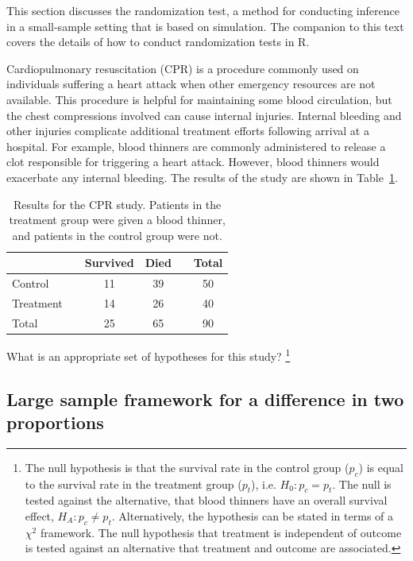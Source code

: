 This section discusses the randomization test, a method for conducting inference in a small-sample setting that is based on simulation. The companion to this text covers the details of how to conduct randomization tests in \textsf{R}.

Cardiopulmonary resuscitation (CPR) is a procedure commonly used on individuals suffering a heart attack when other emergency resources are not available. This procedure is helpful for maintaining some blood circulation, but the chest compressions involved can cause internal injuries. Internal bleeding and other injuries complicate additional treatment efforts following arrival at a hospital. For example, blood thinners are commonly administered to release a clot responsible for triggering a heart attack. However, blood thinners would exacerbate any internal bleeding. The results of the study are shown in Table~\ref{resultsForCPRStudyInSmallSampleSection}.

\begin{table}[ht]
	\centering
	\begin{tabular}{lccccc}
		\hline
		&& Survived 	& Died 	&& Total \\
		\hline
		Control		&& 11		& 39		&& 50 \\
		Treatment		&& 14		& 26		&& 40 \\
		\hline
		Total			&& 25		& 65		&& 90 \\
		\hline
	\end{tabular}
	\caption{Results for the CPR study. Patients in the treatment group were given a blood thinner, and patients in the control group were not.}
	\label{resultsForCPRStudyInSmallSampleSection}
\end{table}

\begin{exercise} What is an appropriate set of hypotheses for this study? \footnote{The null hypothesis is that the survival rate in the control group ($p_c$) is equal to the survival rate in the treatment group ($p_t$), i.e. $H_0: p_c = p_t$. The null is tested against the alternative, that blood thinners have an overall survival effect, $H_A: p_c \neq p_t$. Alternatively, the hypothesis can be stated in terms of a $\chi^2$ framework. The null hypothesis that treatment is independent of outcome is tested against an alternative that treatment and outcome are associated.}
\end{exercise}

\subsection{Large sample framework for a difference in two proportions}

